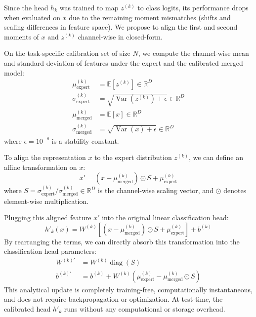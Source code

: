 \documentclass{article}
\theoremstyle{plain}
\theoremstyle{definition}
\theoremstyle{remark}
\begin{document}
Since the head $h_k$ was trained to map $z^{(k)}$ to class logits, its performance drops when evaluated on $x$ due to the remaining moment mismatches (shifts and scaling differences in feature space). We propose to align the first and second moments of $x$ and $z^{(k)}$ channel-wise in closed-form.

On the task-specific calibration set of size $N$, we compute the channel-wise mean and standard deviation of features under the expert and the calibrated merged model:
\begin{align}
\mu_{\text{expert}}^{(k)} &= \mathbb{E}[z^{(k)}] \in \mathbb{R}^D \\
\sigma_{\text{expert}}^{(k)} &= \sqrt{\operatorname{Var}(z^{(k)}) + \epsilon} \in \mathbb{R}^D \\
\mu_{\text{merged}}^{(k)} &= \mathbb{E}[x] \in \mathbb{R}^D \\
\sigma_{\text{merged}}^{(k)} &= \sqrt{\operatorname{Var}(x) + \epsilon} \in \mathbb{R}^D
\end{align}
where $\epsilon = 10^{-8}$ is a stability constant.

To align the representation $x$ to the expert distribution $z^{(k)}$, we can define an affine transformation on $x$:
\begin{equation}
x' = (x - \mu_{\text{merged}}^{(k)}) \odot S + \mu_{\text{expert}}^{(k)}
\end{equation}
where $S = \sigma_{\text{expert}}^{(k)} / \sigma_{\text{merged}}^{(k)} \in \mathbb{R}^D$ is the channel-wise scaling vector, and $\odot$ denotes element-wise multiplication.

Plugging this aligned feature $x'$ into the original linear classification head:
\begin{equation}
h'_k(x) = W^{(k)} \left[ (x - \mu_{\text{merged}}^{(k)}) \odot S + \mu_{\text{expert}}^{(k)} \right] + b^{(k)}
\end{equation}
By rearranging the terms, we can directly absorb this transformation into the classification head parameters:
\begin{align}
W^{(k)\prime} &= W^{(k)} \operatorname{diag}(S) \\
b^{(k)\prime} &= b^{(k)} + W^{(k)} \left( \mu_{\text{expert}}^{(k)} - \mu_{\text{merged}}^{(k)} \odot S \right)
\end{align}
This analytical update is completely training-free, computationally instantaneous, and does not require backpropagation or optimization. At test-time, the calibrated head $h'_k$ runs without any computational or storage overhead.
\end{document}

